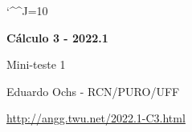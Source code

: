\documentclass[oneside,12pt]{article}
\begin{document}
\catcode`\^^J=10
\pu
\def\pictgridstyle{\color{GrayPale}\linethickness{0.3pt}}
\def\pictaxesstyle{\linethickness{0.5pt}}
\def\pictnaxesstyle{\color{GrayPale}\linethickness{0.5pt}}
\celllower=3pt



\def\u#1{\par{\footnotesize \url{#1}}}

\def\drafturl{http://angg.twu.net/LATEX/2022-1-C3.pdf}
\def\drafturl{http://angg.twu.net/2022.1-C3.html}
\def\draftfooter{\tiny \href{\drafturl}{\jobname{}} \ColorBrown{\shorttoday{} \hours}}



%

\thispagestyle{empty}

\begin{center}

\vspace*{1.2cm}

{\bf \Large Cálculo 3 - 2022.1}

\bsk

Mini-teste 1

\bsk

Eduardo Ochs - RCN/PURO/UFF

\url{http://angg.twu.net/2022.1-C3.html}

\end{center}

\newpage


\pu
\end{document}
